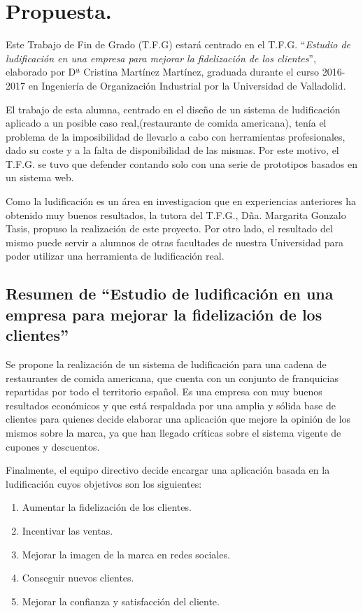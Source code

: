 \documentclass[twoside]{report}
\begin{document}
\section{Propuesta.}
Este Trabajo de Fin de Grado (T.F.G) estará centrado en el T.F.G. \cite{cristinatfg} “\textit{Estudio de ludificación en una empresa para mejorar la fidelización de los clientes}”, elaborado por Dª Cristina Martínez Martínez, graduada durante el curso 2016-2017 en Ingeniería de Organización Industrial por la Universidad de Valladolid.  

El trabajo de esta alumna, centrado en el diseño de un sistema de ludificación aplicado a un posible caso real,(restaurante de comida americana), tenía el problema de la imposibilidad de llevarlo a cabo con herramientas profesionales, dado su coste y a la falta de disponibilidad de las mismas. Por este motivo, el T.F.G. se tuvo que defender contando solo con una serie de prototipos basados en un sistema web. 

Como la ludificación es un área en investigacion que en experiencias anteriores ha obtenido muy buenos resultados, la tutora del T.F.G., Dña. Margarita Gonzalo Tasis, propuso la realización de este proyecto. Por otro lado, el resultado del mismo puede servir a alumnos de otras facultades de nuestra Universidad para poder utilizar una herramienta de ludificación real.

\subsection{Resumen de “Estudio de ludificación en una empresa para mejorar la fidelización de los clientes”}

Se propone la realización de un sistema de ludificación para una cadena de restaurantes de comida americana, que cuenta con un conjunto de franquicias repartidas por todo el territorio español. Es una empresa con muy buenos resultados económicos y que está respaldada por una amplia y sólida base de clientes para quienes decide elaborar una aplicación que mejore la opinión de los mismos sobre la marca, ya que han llegado críticas sobre el sistema vigente de cupones y descuentos.

Finalmente, el equipo directivo decide encargar una aplicación basada en la ludificación cuyos objetivos son los siguientes:

\begin{enumerate}
\item Aumentar la fidelización de los clientes.
\item Incentivar las ventas.
\item Mejorar la imagen de la marca en redes sociales.
\item Conseguir nuevos clientes.
\item Mejorar la confianza y satisfacción del cliente. 
\end{enumerate}
\end{document}
